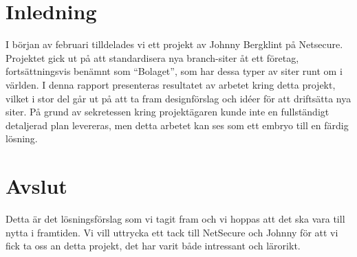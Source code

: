 \section{Inledning}
I början av februari tilldelades vi ett projekt av Johnny Bergklint på Netsecure. Projektet gick ut på att standardisera nya branch-siter åt ett företag, fortsättningsvis benämnt som \textquotedblleft Bolaget\textquotedblright, som har dessa typer av siter runt om i världen. I denna rapport presenteras resultatet av arbetet kring detta projekt, vilket i stor del går ut på att ta fram designförslag och idéer för att driftsätta nya siter. På grund av sekretessen kring projektägaren kunde inte en fullständigt detaljerad plan levereras, men detta arbetet kan ses som ett embryo till en färdig lösning.






\section{Avslut}
Detta är det lösningsförslag som vi tagit fram och vi hoppas att det ska vara till nytta i framtiden. Vi vill uttrycka ett tack till NetSecure och Johnny för att vi fick ta oss an detta projekt, det har varit både intressant och lärorikt.

